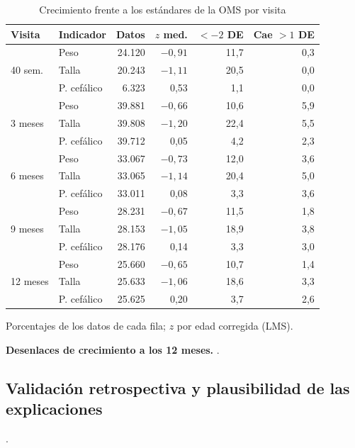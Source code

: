 \begin{table}[t]
\centering
\caption{Crecimiento frente a los estándares de la OMS por visita}
\label{tab:oms}
\footnotesize
\setlength{\tabcolsep}{3pt}
\begin{tabular}{@{}llrrrr@{}}
\toprule
\textbf{Visita} & \textbf{Indicador} & \textbf{Datos} & \textbf{$z$ med.} & \textbf{$<-2$ DE} & \textbf{Cae $>1$ DE} \\
\midrule
\multirow{3}{*}{40 sem.} & Peso & 24.120 & $-0{,}91$ & 11,7 & 0,3 \\
 & Talla & 20.243 & $-1{,}11$ & 20,5 & 0,0 \\
 & P. cefálico & 6.323 & 0,53 & 1,1 & 0,0 \\
\midrule
\multirow{3}{*}{3 meses} & Peso & 39.881 & $-0{,}66$ & 10,6 & 5,9 \\
 & Talla & 39.808 & $-1{,}20$ & 22,4 & 5,5 \\
 & P. cefálico & 39.712 & 0,05 & 4,2 & 2,3 \\
\midrule
\multirow{3}{*}{6 meses} & Peso & 33.067 & $-0{,}73$ & 12,0 & 3,6 \\
 & Talla & 33.065 & $-1{,}14$ & 20,4 & 5,0 \\
 & P. cefálico & 33.011 & 0,08 & 3,3 & 3,6 \\
\midrule
\multirow{3}{*}{9 meses} & Peso & 28.231 & $-0{,}67$ & 11,5 & 1,8 \\
 & Talla & 28.153 & $-1{,}05$ & 18,9 & 3,8 \\
 & P. cefálico & 28.176 & 0,14 & 3,3 & 3,0 \\
\midrule
\multirow{3}{*}{12 meses} & Peso & 25.660 & $-0{,}65$ & 10,7 & 1,4 \\
 & Talla & 25.633 & $-1{,}06$ & 18,6 & 3,3 \\
 & P. cefálico & 25.625 & 0,20 & 3,7 & 2,6 \\
\bottomrule
\end{tabular}
\par\vspace{2pt}\raggedright\scriptsize Porcentajes de los datos de cada fila; $z$ por edad corregida (LMS). 
\end{table}

\textbf{Desenlaces de crecimiento a los 12 meses.} .

\subsection{Validación retrospectiva y plausibilidad de las explicaciones}
\label{sec:res-silencio}
.

